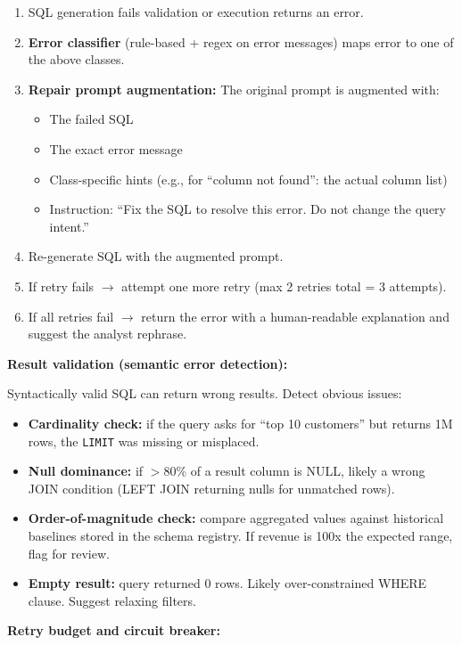 \begin{enumerate}
  \item SQL generation fails validation or execution returns an error.
  \item \textbf{Error classifier} (rule-based + regex on error messages) maps error to one of the above classes.
  \item \textbf{Repair prompt augmentation:} The original prompt is augmented with:
  \begin{itemize}
    \item The failed SQL
    \item The exact error message
    \item Class-specific hints (e.g., for ``column not found'': the actual column list)
    \item Instruction: ``Fix the SQL to resolve this error. Do not change the query intent.''
  \end{itemize}
  \item Re-generate SQL with the augmented prompt.
  \item If retry fails $\rightarrow$ attempt one more retry (max 2 retries total = 3 attempts).
  \item If all retries fail $\rightarrow$ return the error with a human-readable explanation and suggest the analyst rephrase.
\end{enumerate}

\textbf{Result validation (semantic error detection):}

Syntactically valid SQL can return wrong results. Detect obvious issues:
\begin{itemize}
  \item \textbf{Cardinality check:} if the query asks for ``top 10 customers'' but returns 1M rows, the \texttt{LIMIT} was missing or misplaced.
  \item \textbf{Null dominance:} if $>$80\% of a result column is NULL, likely a wrong JOIN condition (LEFT JOIN returning nulls for unmatched rows).
  \item \textbf{Order-of-magnitude check:} compare aggregated values against historical baselines stored in the schema registry. If revenue is 100x the expected range, flag for review.
  \item \textbf{Empty result:} query returned 0 rows. Likely over-constrained WHERE clause. Suggest relaxing filters.
\end{itemize}

\textbf{Retry budget and circuit breaker:}

